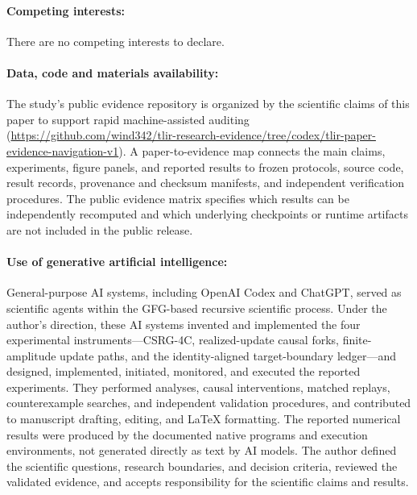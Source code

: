 \documentclass[12pt,letterpaper]{article}
\begin{document}
\paragraph*{Competing interests:}
There are no competing interests to declare.

\paragraph*{Data, code and materials availability:}
The study's public evidence repository is organized by the scientific claims of this paper to support rapid machine-assisted auditing (\url{https://github.com/wind342/tlir-research-evidence/tree/codex/tlir-paper-evidence-navigation-v1}). A paper-to-evidence map connects the main claims, experiments, figure panels, and reported results to frozen protocols, source code, result records, provenance and checksum manifests, and independent verification procedures. The public evidence matrix specifies which results can be independently recomputed and which underlying checkpoints or runtime artifacts are not included in the public release.

\paragraph*{Use of generative artificial intelligence:}
General-purpose AI systems, including OpenAI Codex and ChatGPT, served as scientific agents within the GFG-based recursive scientific process. Under the author's direction, these AI systems invented and implemented the four experimental instruments---CSRG-4C, realized-update causal forks, finite-amplitude update paths, and the identity-aligned target-boundary ledger---and designed, implemented, initiated, monitored, and executed the reported experiments. They performed analyses, causal interventions, matched replays, counterexample searches, and independent validation procedures, and contributed to manuscript drafting, editing, and LaTeX formatting. The reported numerical results were produced by the documented native programs and execution environments, not generated directly as text by AI models. The author defined the scientific questions, research boundaries, and decision criteria, reviewed the validated evidence, and accepts responsibility for the scientific claims and results.
\end{document}
